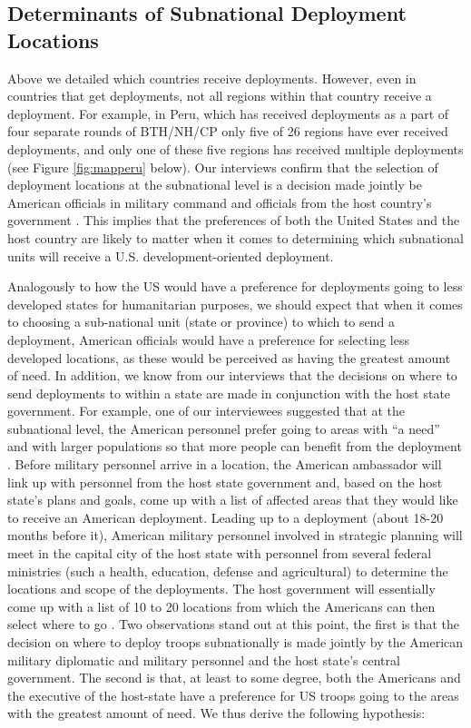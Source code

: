\documentclass[12pt]{article}
\begin{document}
\begin{doublespace}
\subsection{Determinants of Subnational Deployment Locations}

Above we detailed which countries receive deployments. However, even in countries that get deployments, not all regions within that country receive a deployment. For example, in Peru, which has received deployments as a part of four separate rounds of BTH/NH/CP only five of 26 regions have ever received deployments, and only one of these five regions has received multiple deployments (see Figure \ref{fig:mapperu} below).  Our interviews confirm that the selection of deployment locations at the subnational level is a decision made jointly be American officials in military command and officials from the host country's government \cite{SFC20160226,CPT20160309}.  This implies that the preferences of both the United States and the host country are likely to matter when it comes to determining which subnational units will receive a U.S. development-oriented deployment.

Analogously to how the US would have a preference for deployments going to less developed states for humanitarian purposes, we should expect that when it comes to choosing a sub-national unit (state or province) to which to send a deployment, American officials would have a preference for selecting less developed locations, as these would be perceived as having the greatest amount of need.  In addition, we know from our interviews that the decisions on where to send deployments to within a state are made in conjunction with the host state government.  For example, one of our interviewees suggested that at the subnational level, the American personnel prefer going to areas with ``a need'' and with larger populations so that more people can benefit from the deployment \cite{CPT20160309}.  Before military personnel arrive in a location, the American ambassador will link up with personnel from the host state government and, based on the host state's plans and goals, come up with a list of affected areas that they would like to receive an American deployment.  Leading up to a deployment (about 18-20 months before it), American military personnel involved in strategic planning will meet in the capital city of the host state with personnel from several federal ministries (such a health, education, defense and agricultural) to determine the locations and scope of the deployments. The host government will essentially come up with a list of 10 to 20 locations from which the Americans can then select where to go \cite{CPT20160309}.  Two observations stand out at this point, the first is that the decision on where to deploy troops subnationally is made jointly by the American military diplomatic and military personnel and the host state's central government.  The second is that, at least to some degree, both the Americans and the executive of the host-state have a preference for US troops going to the areas with the greatest amount of need.  We thus derive the following hypothesis:     


\end{doublespace}
\end{document}
